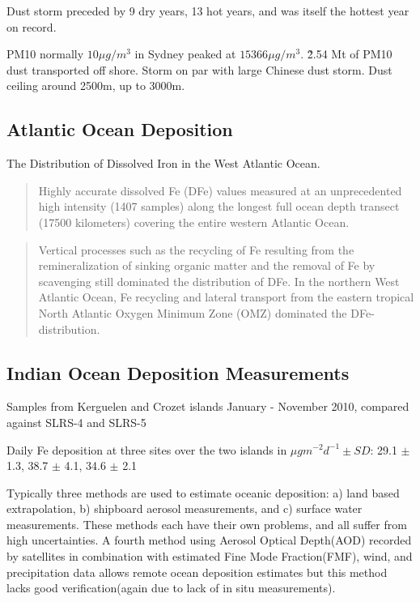 Dust storm preceded by 9 dry years, 13 hot years, and was itself the hottest year on record.

PM10 normally $10{\mu}g/m^3$ in Sydney peaked at $15366{\mu}g/m^3$.
\~2.54 Mt of PM10 dust transported off shore.
Storm on par with large Chinese dust storm.
Dust ceiling around 2500m, up to 3000m.

\subsection{Atlantic Ocean Deposition \cite{Rijkenberg_2014}}
The Distribution of Dissolved Iron in the West Atlantic Ocean.

\begin{quote}
Highly accurate dissolved Fe (DFe) values measured at an unprecedented high intensity (1407 samples) along the longest full ocean depth transect (17500 kilometers) covering the entire western Atlantic Ocean.
\end{quote}

\begin{quote}
Vertical processes such as the recycling of Fe resulting from the remineralization of sinking organic matter and the removal of Fe by scavenging still dominated the distribution of DFe. In the northern West Atlantic Ocean, Fe recycling and lateral transport from the eastern tropical North Atlantic Oxygen Minimum Zone (OMZ) dominated the DFe-distribution.
\end{quote}

\subsection{Indian Ocean Deposition Measurements \cite{Heimburger_2013}}
Samples from Kerguelen and Crozet islands January - November 2010, compared against SLRS-4 and SLRS-5

Daily Fe deposition at three sites over the two islands in ${\mu}gm^{-2}d^{-1} \pm SD$:
29.1 $\pm$ 1.3, 38.7 $\pm$ 4.1, 34.6 $\pm$ 2.1

Typically three methods are used to estimate oceanic deposition: a) land based extrapolation, b) shipboard aerosol measurements, and c) surface water measurements. 
These methods each have their own problems, and all suffer from high uncertainties. 
A fourth method using Aerosol Optical Depth(AOD) recorded by satellites in combination with estimated Fine Mode Fraction(FMF), wind, and precipitation data allows remote ocean deposition estimates but this method lacks good verification(again due to lack of in situ measurements). 

